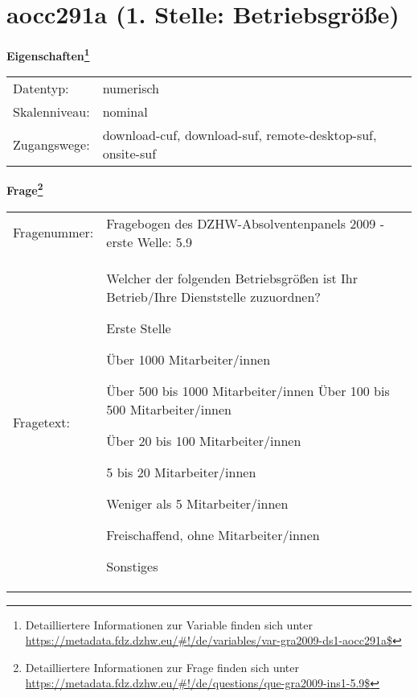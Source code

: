 
    \setcounter{footnote}{0}

    \vspace*{-1.8cm}
	\section{aocc291a (1. Stelle: Betriebsgröße)}
	\label{section:aocc291a}



    \vspace*{0.5cm}
    \noindent\textbf{Eigenschaften\footnote{Detailliertere Informationen zur Variable finden sich unter
		\url{https://metadata.fdz.dzhw.eu/\#!/de/variables/var-gra2009-ds1-aocc291a$}}}\\
	\begin{tabularx}{\hsize}{@{}lX}
	Datentyp: & numerisch \\
	Skalenniveau: & nominal \\
	Zugangswege: &
	  download-cuf, 
	  download-suf, 
	  remote-desktop-suf, 
	  onsite-suf
 \\
    \end{tabularx}



				\vspace*{0.5cm}
                \noindent\textbf{Frage\footnote{Detailliertere Informationen zur Frage finden sich unter
		              \url{https://metadata.fdz.dzhw.eu/\#!/de/questions/que-gra2009-ins1-5.9$}}}\\
				\begin{tabularx}{\hsize}{@{}lX}
					Fragenummer: &
					  Fragebogen des DZHW-Absolventenpanels 2009 - erste Welle:
					  5.9
 \\
					Fragetext: & Welcher der folgenden Betriebsgrößen ist Ihr Betrieb/Ihre Dienststelle zuzuordnen?\par  Erste Stelle\par  Über 1000 Mitarbeiter/innen\par  Über 500 bis 1000 Mitarbeiter/innen Über 100 bis 500 Mitarbeiter/innen\par  Über 20 bis 100 Mitarbeiter/innen\par  5 bis 20 Mitarbeiter/innen\par  Weniger als 5 Mitarbeiter/innen\par  Freischaffend, ohne Mitarbeiter/innen\par  Sonstiges \\
				\end{tabularx}





